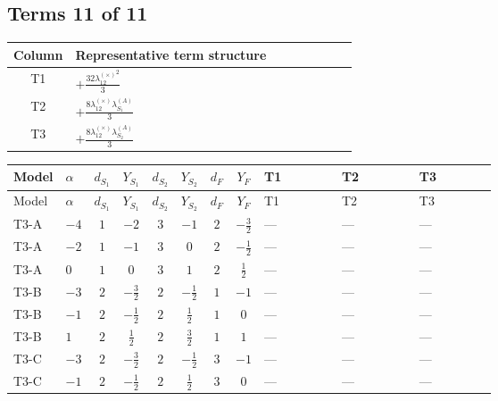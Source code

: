\documentclass[8pt]{article}
\begin{document}
\begin{landscape}
\subsection*{Terms 11 of 11}
\begin{center}
\begin{tabular}{@{}c >{\raggedright\arraybackslash}p{0.82\linewidth}@{}}
\toprule
Column & Representative term structure \\
\midrule
T1 & \(\displaystyle +\frac{32 {\lambda_{12}^{(\times)}}^2}{3}\) \\
\midrule
T2 & \(\displaystyle +\frac{8 {\lambda_{12}^{(\times)}} {\lambda_{S_1}^{(A)}}}{3}\) \\
\midrule
T3 & \(\displaystyle +\frac{8 {\lambda_{12}^{(\times)}} {\lambda_{S_2}^{(A)}}}{3}\) \\
\midrule
\bottomrule
\end{tabular}
\end{center}
\smallskip
\tiny
\begin{longtable}{@{}llcccccc >{\raggedright\arraybackslash}p{0.21\linewidth} >{\raggedright\arraybackslash}p{0.21\linewidth} >{\raggedright\arraybackslash}p{0.21\linewidth}@{}}
\toprule
Model & $\alpha$ & $d_{S_1}$ & $Y_{S_1}$ & $d_{S_2}$ & $Y_{S_2}$ & $d_F$ & $Y_F$ & T1 & T2 & T3 \\
\midrule
\endfirsthead
\toprule
Model & $\alpha$ & $d_{S_1}$ & $Y_{S_1}$ & $d_{S_2}$ & $Y_{S_2}$ & $d_F$ & $Y_F$ & T1 & T2 & T3 \\
\midrule
\endhead
T3-A & $-4$ & $1$ & $-2$ & $3$ & $-1$ & $2$ & $-\frac{3}{2}$ & --- & --- & --- \\
\midrule
T3-A & $-2$ & $1$ & $-1$ & $3$ & $0$ & $2$ & $-\frac{1}{2}$ & --- & --- & --- \\
\midrule
T3-A & $0$ & $1$ & $0$ & $3$ & $1$ & $2$ & $\frac{1}{2}$ & --- & --- & --- \\
\midrule
T3-B & $-3$ & $2$ & $-\frac{3}{2}$ & $2$ & $-\frac{1}{2}$ & $1$ & $-1$ & --- & --- & --- \\
\midrule
T3-B & $-1$ & $2$ & $-\frac{1}{2}$ & $2$ & $\frac{1}{2}$ & $1$ & $0$ & --- & --- & --- \\
\midrule
T3-B & $1$ & $2$ & $\frac{1}{2}$ & $2$ & $\frac{3}{2}$ & $1$ & $1$ & --- & --- & --- \\
\midrule
T3-C & $-3$ & $2$ & $-\frac{3}{2}$ & $2$ & $-\frac{1}{2}$ & $3$ & $-1$ & --- & --- & --- \\
\midrule
T3-C & $-1$ & $2$ & $-\frac{1}{2}$ & $2$ & $\frac{1}{2}$ & $3$ & $0$ & --- & --- & --- \\

\end{longtable}
\end{landscape}
\end{document}
